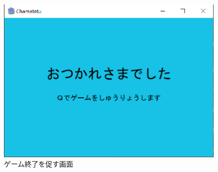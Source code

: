 \documentclass[a4j]{jarticle}
\begin{document}
        \begin{figure}[H]
            \centering
            \includegraphics[scale=1.3]{quit.eps}
            \caption{ゲーム終了を促す画面}
             \label{quit}
            \end{figure}
\end{document}
